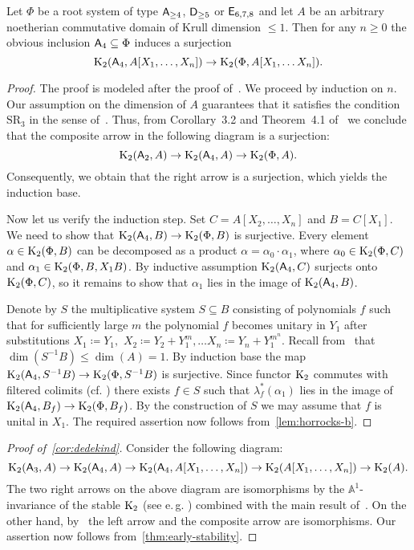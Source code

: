 \begin{thm}\label{thm:early-stability}
Let $\Phi$ be a root system of type $\mathsf{A}_{\geq 4}$, $\mathsf{D}_{\geq 5}$ or $\mathsf{E}_{6,7,8}$ and let $A$ be an arbitrary noetherian commutative
 domain of Krull dimension $\leq 1$.
Then for any $n \geq 0$ the obvious inclusion $\mathsf{A}_4 \subseteq \Phi$ induces a surjection
\[\operatorname{K}_2(\mathsf{A}_4, A[X_1,\ldots, X_n]) \to \operatorname{K}_2(\Phi, A[X_1, \ldots X_n]).\]
\end{thm}
\begin{proof}
    The proof is modeled after the proof of~\cite[Theorem~5.3]{Tu83}.
    We proceed by induction on $n$.
    Our assumption on the dimension of $A$ guarantees that it satisfies the condition $\mathrm{SR}_3$ in the sense of~\cite{St78}.
    Thus, from Corollary~3.2 and Theorem~4.1 of~\cite{St78} we conclude that the composite arrow in the following diagram is a surjection:
    \[\operatorname{K}_2(\mathsf{A}_2, A) \to \operatorname{K}_2(\mathsf{A}_4, A) \to \operatorname{K}_2(\Phi, A).\]
    Consequently, we obtain that the right arrow is a surjection, which yields the induction base.

    Now let us verify the induction step.
    Set $C = A[X_2, \ldots , X_n]$ and $B = C[X_1]$.
    We need to show that $\operatorname{K}_2(\mathsf{A}_4, B) \to \operatorname{K}_2(\Phi, B)$ is surjective.
    Every element $\alpha \in \operatorname{K}_2(\Phi, B)$ can be decomposed as a product $\alpha = \alpha_0 \cdot \alpha_1$,
      where $\alpha_0 \in \operatorname{K}_2(\Phi, C)$ and $\alpha_1 \in \operatorname{K}_2(\Phi, B, X_1 B)$.
    By inductive assumption $\operatorname{K}_2(\mathsf{A}_4, C)$ surjects onto $\operatorname{K}_2(\Phi, C)$, so it remains to show that $\alpha_1$ lies in the image of $\operatorname{K}_2(\mathsf{A}_4, B)$.

    Denote by $S$ the multiplicative system $S \subseteq B$ consisting of polynomials $f$ such that for sufficiently large $m$
    the polynomial $f$ becomes unitary in $Y_1$ after substitutions $X_1 \coloneqq Y_1,$ $X_2 \coloneqq Y_2 + Y_1^m, \ldots X_n \coloneqq Y_n + Y_1^{m^n}$.
    Recall from~\cite[\S~6]{Su77} that $\dim(S^{-1}B) \leq \dim(A) = 1$.
    By induction base the map $\operatorname{K}_2(\mathsf{A}_4, S^{-1}B) \to \operatorname{K}_2(\Phi, S^{-1}B)$ is surjective.
    Since functor $\operatorname{K}_2$ commutes with filtered colimits (cf. \cite[Lemma~3.3]{LSV2}) there exists $f \in S$ such that $\lambda^*_f(\alpha_1)$ lies in the image of $\operatorname{K}_2(\mathsf{A}_4, B_f) \to \operatorname{K}_2(\Phi, B_f)$.
    By the construction of $S$ we may assume that $f$ is unital in $X_1$.
    The required assertion now follows from~\cref{lem:horrocks-b}.
\end{proof}


\begin{proof}[Proof of~\cref{cor:dedekind}]
    Consider the following diagram:
    \[ \operatorname{K}_2(\mathsf{A}_3, A) \to \operatorname{K}_2(\mathsf{A}_4, A) \to \operatorname{K}_2(\mathsf{A}_4, A[X_1, \ldots, X_n]) \rightarrow \operatorname{K}_2(A[X_1, \ldots, X_n]) \to \operatorname{K}_2(A).\]
    The two right arrows on the above diagram are isomorphisms by the $\mathbb{A}^1$-invariance of the stable $\operatorname{K}_2$
    (see e.\,g. \cite[Theorem~V.6.3]{Kbook}) combined with the main result of~\cite{Tu83}.
    On the other hand, by~\cite[Corollary~3.2]{ST76} the left arrow and the composite arrow are isomorphisms.
    Our assertion now follows from~\cref{thm:early-stability}.
\end{proof}